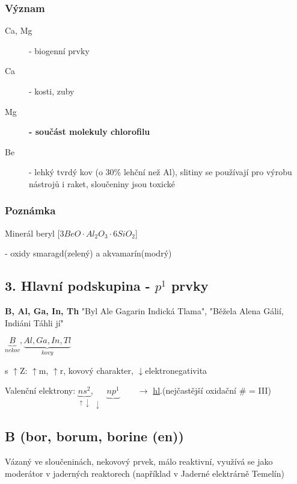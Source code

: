     \subsubsection*{Význam}
    \begin{description}
        \item[Ca, Mg] - biogenní prvky
        \item[Ca] - kosti, zuby
        \item[Mg] \textbf{- součást molekuly chlorofilu}
        \item[Be] - lehký tvrdý kov (o 30\% lehční než Al), slitiny se používají pro výrobu nástrojů i raket, sloučeniny jsou toxické
    \end{description}

    \subsubsection*{Poznámka}
    Minerál beryl [$3BeO \cdot Al_2O_3 \cdot 6SiO_2$]

    - oxidy smaragd(zelený) a akvamarín(modrý)

\subsection{3. Hlavní podskupina - $p^1$ prvky}
\textbf{B, Al, Ga, In, Th}
"Byl Ale Gagarin Indická Tlama", "Běžela Alena Gálií, Indiáni Táhli jí"

\vspace{1em}

$\underbrace{B}_{nekov}, \underbrace{Al, Ga, In, Tl}_{kovy}$

\vspace{1em}

s $\uparrow$Z: $\uparrow$m, $\uparrow$r, kovový charakter, $\downarrow$elektronegativita

\vspace{1em}

Valenční elektrony: 
\( \underbrace{ns^2}_{\boxed{\uparrow\downarrow}} , \underbrace{np^1}_{\boxed{\downarrow\phantom{\uparrow}}\boxed{\phantom{\downarrow\uparrow}}\boxed{\phantom{\downarrow\uparrow}}} \)
$\; \rightarrow$ \underline{hl}.(nejčastější oxidační \# = III)

\subsection{B (bor, borum, borine (en))}
Vázaný ve sloučeninách, nekovový prvek, málo reaktivní, využívá se jako moderátor v jaderných reaktorech (například v Jaderné elektrárně Temelín)

